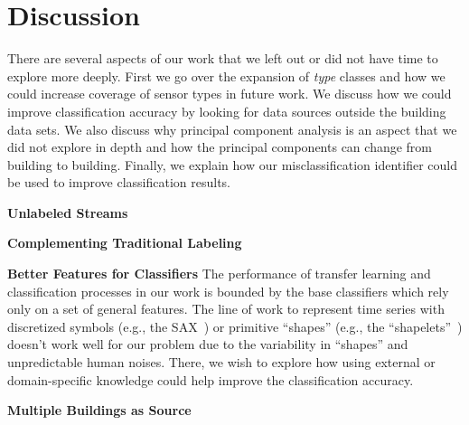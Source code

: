 \section{Discussion}
There are several aspects of our work that we left out or did not have time to explore more deeply.
First we go over the expansion of \emph{type} classes and how we could increase coverage of sensor types in future work. 
We discuss how we could improve classification accuracy
by looking for data sources outside the building data sets. We also discuss why principal component analysis is an aspect that we
did not explore in depth and how the principal components can change from building to building.  Finally, we 
explain how our misclassification identifier could be used to improve classification results.

\textbf{Unlabeled Streams}

\textbf{Complementing Traditional Labeling}

\textbf{Better Features for Classifiers}
The performance of transfer learning and classification processes in our work is bounded by the base classifiers which rely only on a set of general features. The line of work to represent time series with discretized symbols (e.g., the SAX~\cite{sax}) or primitive ``shapes'' (e.g., the ``shapelets''~\cite{shapelet1, shapelet2}) doesn't work well for our problem due to the variability in ``shapes'' and unpredictable human noises. There, we wish to explore how using external or domain-specific knowledge could help improve the classification accuracy. 

\textbf{Multiple Buildings as Source}


